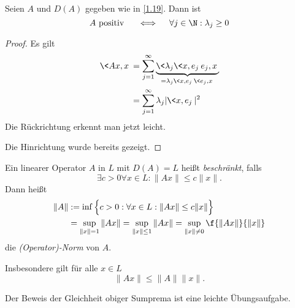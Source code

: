 \documentclass{mycourse}
\begin{document}
\begin{nt} \label{1.22}
	Seien $A$ und $D(A)$ gegeben wie in \ref{1.19}.
	Dann ist
	\[
		A \text{ positiv }  \quad\iff\quad \forall j\in \N : \lambda_j \ge 0
	\]
	\begin{proof}
		Es gilt
		\begin{align*}
			\<Ax, x \> 
			&= \sum_{j=1}^\infty \underbrace{\<\lambda_j \<x,e_j\> e_j, x\>}_{= \lambda_j\<x,e_j\> \<e_j,x\>} \\
			&= \sum_{j=1}^\infty \lambda_j |\<x,e_j\>|^2
		\end{align*}
		Die Rückrichtung erkennt man jetzt leicht.

		Die Hinrichtung wurde bereits gezeigt.
	\end{proof}
\end{nt}

\begin{df} \label{1.23}
	Ein linearer Operator $A$ in $L$ mit $D(A) = L$ heißt \emph{beschränkt}, falls
	\[
		\exists c > 0 \forall x \in L : \|Ax\| \le c\|x\|.
	\]
	Dann heißt
	\begin{align*}
		\|A\| &:= \inf \Big\{ c > 0 : \forall x \in L : \|Ax\| \le c\|x\| \Big\} \\
		&= \sup_{\|x\|=1} \|Ax\| = \sup_{\|x\|\le 1} \|Ax\| = \sup_{\|x\|\neq 0} \f{\|Ax\|}{\|x\|}
	\end{align*}
	die \emph{(Operator)-Norm} von $A$.

	Insbesondere gilt für alle $ x\in L $
	\[
		\|Ax\| \le \|A\| \|x\|.
	\]
	\begin{note}
		Der Beweis der Gleichheit obiger Sumprema ist eine leichte Übungsaufgabe.
	\end{note}
\end{df}
\end{document}
